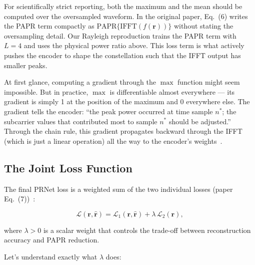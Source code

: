 For scientifically strict reporting, both the maximum and the mean should be computed over the oversampled waveform.  In the original paper, Eq.~(6) writes the PAPR term compactly as $\mathrm{PAPR}\{\mathrm{IFFT}(f(\bm{r}))\}$ without stating the oversampling detail.  Our Rayleigh reproduction trains the PAPR term with $L=4$ and uses the physical power ratio above.  This loss term is what actively pushes the encoder to shape the constellation such that the IFFT output has smaller peaks.

\begin{keyinsight}
    At first glance, computing a gradient through the $\max$ function might seem impossible.  But in practice, $\max$ is differentiable almost everywhere --- its gradient is simply 1 at the position of the maximum and 0 everywhere else.  The gradient tells the encoder: ``the peak power occurred at time sample $n^*$; the subcarrier values that contributed most to sample $n^*$ should be adjusted.'' Through the chain rule, this gradient propagates backward through the IFFT (which is just a linear operation) all the way to the encoder's weights~\cite{kim2017novel}.
\end{keyinsight}


\subsection{The Joint Loss Function}

The final PRNet loss is a weighted sum of the two individual losses (paper Eq.~(7))~\cite{kim2017novel}:
\begin{keyresult}
    \begin{equation}
        \mathcal{L}(\bm{r},\hat{\bm{r}})
        = \mathcal{L}_1(\bm{r},\hat{\bm{r}}) + \lambda\,\mathcal{L}_2(\bm{r}),
    \end{equation}
\end{keyresult}
where $\lambda > 0$ is a scalar weight that controls the trade-off between reconstruction accuracy and PAPR reduction.

Let's understand exactly what $\lambda$ does:

